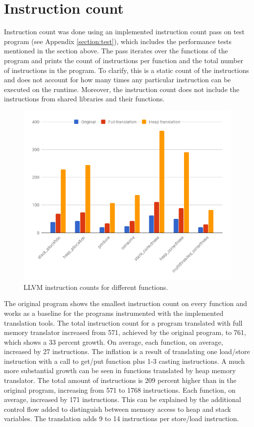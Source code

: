 \documentclass[bsc,frontabs,twoside,singlespacing,parskip,deptreport]{infthesis}     %
\begin{document}
\section{Instruction count}

Instruction count was done using an implemented instruction count pass on test program (see Appendix \ref{section:test}), which includes the performance tests mentioned in the section above. The pass iterates over the functions of the program and prints the count of instructions per function and the total number of instructions in the program. To clarify, this is a static count of the instructions and does not account for how many times any particular instruction can be executed on the runtime. Moreover, the instruction count does not include the instructions from shared libraries and their functions.

\begin{figure}[H]
\centering
\includegraphics[width=1\textwidth]{images/instruction_count}
\caption{LLVM instruction counts for different functions.}
\label{fig:instruction_count}
\end{figure}

The original program shows the smallest instruction count on every function and works as a baseline for the programs instrumented with the implemented translation tools. The total instruction count for a program translated with full memory translator increased from 571, achieved by the original program, to 761, which shows a 33 percent growth. On average, each function, on average, increased by 27 instructions. The inflation is a result of translating one load/store instruction with a call to get/put function plus 1-3 casting instructions. A much more substantial growth can be seen in functions translated by heap memory translator. The total amount of instructions is 209 percent higher than in the original program, increasing from 571 to 1768 instructions. Each function, on average, increased by 171 instructions. This can be explained by the additional control flow added to distinguish between memory access to heap and stack variables. The translation adds 9 to 14 instructions per store/load instruction.
\end{document}
